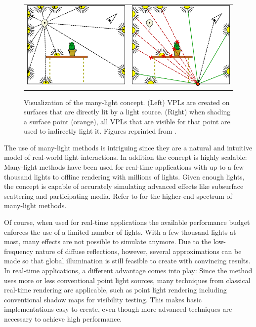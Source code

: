 \begin{figure}[htb]
\centering
  \begin{tabular}{@{}cc@{}}
    \includegraphics[width=.48\textwidth]{graphics/many_lights_laine_1} &
    \includegraphics[width=.48\textwidth]{graphics/many_lights_laine_2}\\
  \end{tabular}
  \caption{Visualization of the many-light concept. (Left) VPLs are created on surfaces that are directly lit by a light source. (Right) when shading a surface point (orange), all VPLs that are visible for that point are used to indirectly light it. Figures reprinted from \citet{laine2007incremental}.}
  \label{fig:intro:many_lights_visualization}
\end{figure}

The use of many-light methods is intriguing since they are a natural and intuitive model of real-world light interactions. In addition the concept is highly scalable: Many-light methods have been used for real-time applications with up to a few thousand lights to offline rendering with millions of lights. Given enough lights, the concept is capable of accurately simulating advanced effects like subsurface scattering and participating media. Refer to \citet{Dachsbacher:2014:ManyLightsSTAR} for the higher-end spectrum of many-light methods.

Of course, when used for real-time applications the available performance budget enforces the use of a limited number of lights. With a few thousand lights at most, many effects are not possible to simulate anymore. Due to the low-frequency nature of diffuse reflections, however, several approximations can be made so that global illumination is still feasible to create with convincing results. In real-time applications, a different advantage comes into play: Since the method uses more or less conventional point light sources, many techniques from classical real-time rendering are applicable, such as point light rendering including conventional shadow maps for visibility testing. This makes basic implementations easy to create, even though more advanced techniques are necessary to achieve high performance.



